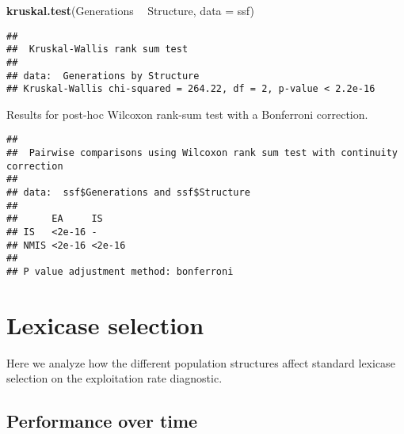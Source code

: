 \documentclass[]{book}
\newenvironment{Shaded}{\begin{snugshade}}{\end{snugshade}}
\newcommand{\DataTypeTok}[1]{\textcolor[rgb]{0.13,0.29,0.53}{#1}}
\newcommand{\KeywordTok}[1]{\textcolor[rgb]{0.13,0.29,0.53}{\textbf{#1}}}
\newcommand{\NormalTok}[1]{#1}
\newcommand{\OperatorTok}[1]{\textcolor[rgb]{0.81,0.36,0.00}{\textbf{#1}}}
\newcommand{\OtherTok}[1]{\textcolor[rgb]{0.56,0.35,0.01}{#1}}
\newcommand{\StringTok}[1]{\textcolor[rgb]{0.31,0.60,0.02}{#1}}
\begin{document}
\begin{Shaded}
\begin{Highlighting}[]
\KeywordTok{kruskal.test}\NormalTok{(Generations }\OperatorTok{~}\StringTok{ }\NormalTok{Structure, }\DataTypeTok{data =}\NormalTok{ ssf)}
\end{Highlighting}
\end{Shaded}

\begin{verbatim}
## 
##  Kruskal-Wallis rank sum test
## 
## data:  Generations by Structure
## Kruskal-Wallis chi-squared = 264.22, df = 2, p-value < 2.2e-16
\end{verbatim}

Results for post-hoc Wilcoxon rank-sum test with a Bonferroni correction.

\begin{Shaded}
\end{Shaded}

\begin{verbatim}
## 
##  Pairwise comparisons using Wilcoxon rank sum test with continuity correction 
## 
## data:  ssf$Generations and ssf$Structure 
## 
##      EA     IS    
## IS   <2e-16 -     
## NMIS <2e-16 <2e-16
## 
## P value adjustment method: bonferroni
\end{verbatim}

\hypertarget{lexicase-selection-4}{%
\section{Lexicase selection}\label{lexicase-selection-4}}

Here we analyze how the different population structures affect standard lexicase selection on the exploitation rate diagnostic.

\hypertarget{performance-over-time-11}{%
\subsection{Performance over time}\label{performance-over-time-11}}
\end{document}
